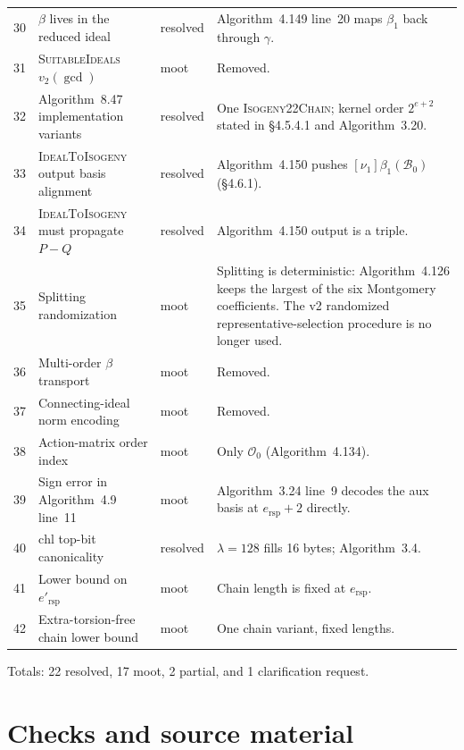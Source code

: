 \documentclass[a4paper,11pt]{article}
\newcommand{\algo}[1]{Algorithm~#1}
\newcommand{\Oo}{\mathcal{O}_0}
\begin{document}
\begin{longtable}{@{}r >{\raggedright\arraybackslash}p{}
  >{\raggedright\arraybackslash}p{}
  >{\raggedright\arraybackslash}p{}@{}}
30 & $\beta$ lives in the reduced ideal & resolved &
  \algo{4.149} line~20 maps $\beta_1$ back through $\gamma$. \\
31 & \textsc{SuitableIdeals} $v_2(\gcd)$ & moot & Removed. \\
32 & \algo{8.47} implementation variants & resolved &
  One \textsc{Isogeny22Chain}; kernel order $2^{e+2}$ stated in
  \S4.5.4.1 and \algo{3.20}. \\
33 & \textsc{IdealToIsogeny} output basis alignment & resolved &
  \algo{4.150} pushes $[\nu_1]\beta_1(\mathcal{B}_0)$ (\S4.6.1). \\
34 & \textsc{IdealToIsogeny} must propagate $P - Q$ & resolved &
  \algo{4.150} output is a triple. \\
35 & Splitting randomization & moot &
  Splitting is deterministic: \algo{4.126} keeps the largest of the six
  Montgomery coefficients. The v2 randomized representative-selection
  procedure is no longer used. \\
36 & Multi-order $\beta$ transport & moot & Removed. \\
37 & Connecting-ideal norm encoding & moot & Removed. \\
38 & Action-matrix order index & moot &
  Only $\Oo$ (\algo{4.134}). \\
39 & Sign error in \algo{4.9} line~11 & moot &
  \algo{3.24} line~9 decodes the aux basis at
  $e_{\mathrm{rsp}} + 2$ directly. \\
40 & $\mathrm{chl}$ top-bit canonicality & resolved &
  $\lambda = 128$ fills 16 bytes; \algo{3.4}. \\
41 & Lower bound on $e'_{\mathrm{rsp}}$ & moot &
  Chain length is fixed at $e_{\mathrm{rsp}}$. \\
42 & Extra-torsion-free chain lower bound & moot &
  One chain variant, fixed lengths. \\
\bottomrule
\end{longtable}
\endgroup

Totals: 22 resolved, 17 moot, 2 partial, and 1 clarification request.


\clearpage
\section*{Checks and source material}
\label{sec:checks}
\end{document}
